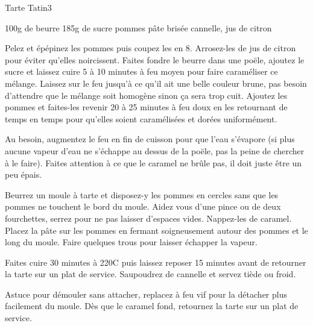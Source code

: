 \begin{recette}{Tarte Tatin}{3}{}{}
\begin{ingredients}
\ingredient 100g de beurre
\ingredient 185g de sucre
 pommes
 pâte brisée
\ingredient cannelle, jus de citron
\end{ingredients}

\begin{preparation}
\etape Pelez et épépinez les pommes puis coupez les en 8. Arrosez-les de jus de citron pour éviter qu'elles noircissent.
\etape Faites fondre le beurre dans une poële, ajoutez le sucre et laissez cuire 5 à 10 minutes à feu moyen pour faire caraméliser ce mélange. Laissez sur le feu jusqu'à ce qu'il ait une belle couleur brune, pas besoin d'attendre que le mélange soit homogène sinon ça sera trop cuit. 
\etape Ajoutez les pommes et faites-les revenir 20 à 25 minutes à feu doux en les retournant de temps en temps pour qu'elles soient caramélisées et dorées uniformément.
\begin{remarque}
Au besoin, augmentez le feu en fin de cuisson pour que l'eau s'évapore (si plus aucune vapeur d'eau ne s'échappe au dessus de la poële, pas la peine de chercher à le faire). Faites attention à ce que le caramel ne brûle pas, il doit juste être un peu épais. 
\end{remarque}

\etape Beurrez un moule à tarte et disposez-y les pommes en cercles sans que les pommes ne touchent le bord du moule. Aidez vous d'une pince ou de deux fourchettes, serrez pour ne pas laisser d'espaces vides. Nappez-les de caramel. 
\etape Placez la pâte sur les pommes en fermant soigneusement autour des pommes et le long du moule. Faire quelques trous pour laisser échapper la vapeur.
\end{preparation}

\begin{cuisson}
Faites cuire 30 minutes à 220\degres C puis laissez reposer 15 minutes avant de retourner la tarte sur un plat de service. Saupoudrez de cannelle et servez tiède ou froid.

\begin{remarque}
Astuce pour démouler sans attacher, replacez à feu vif pour la détacher plus facilement du moule. Dès que le caramel fond, retournez la tarte sur un plat de service.
\end{remarque}
\end{cuisson}
\end{recette}

